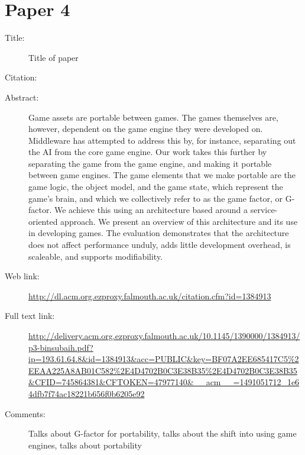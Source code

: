 \documentclass{scrartcl}
\begin{document}
\section*{Paper 4}
\begin{description}
\item[Title:] Title of paper
\item[Citation:] \cite{binsubaih2008game}
\item[Abstract:] Game assets are portable between games. The games themselves are, however, dependent on the game engine they were developed on. Middleware has attempted to address this by, for instance, separating out the AI from the core game engine. Our work takes this further by separating the game from the game engine, and making it portable between game engines. The game elements that we make portable are the game logic, the object model, and the game state, which represent the game's brain, and which we collectively refer to as the game factor, or G-factor. We achieve this using an architecture based around a service-oriented approach. We present an overview of this architecture and its use in developing games. The evaluation demonstrates that the architecture does not affect performance unduly, adds little development overhead, is scaleable, and supports modifiability.
\item[Web link:] \url{http://dl.acm.org.ezproxy.falmouth.ac.uk/citation.cfm?id=1384913}
\item[Full text link:] \url{http://delivery.acm.org.ezproxy.falmouth.ac.uk/10.1145/1390000/1384913/p3-binsubaih.pdf?ip=193.61.64.8&id=1384913&acc=PUBLIC&key=BF07A2EE685417C5%2EEAA225A8AB01C582%2E4D4702B0C3E38B35%2E4D4702B0C3E38B35&CFID=745864381&CFTOKEN=47977140&__acm__=1491051712_1e64dfb7f74ac18221b656f0b6205e92}
\item[Comments:] Talks about G-factor for portability, talks about the shift into using game engines, talks about portability 
\end{description}
\end{document}
